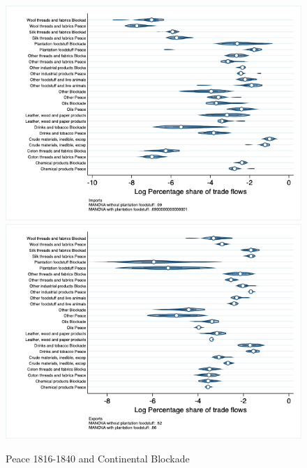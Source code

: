 \documentclass[12pt,a4paper,notitlepage,english]{article}
\begin{document}
\begin{appendix}
\begin{figure}[h!]
\centering
\caption{Peace 1816-1840 and Continental Blockade}
\label{peace1816_1840_block_nat_distr_sitc}
\includegraphics[scale=.4]{peace1816_1840_block_nat_distr_Isitc}
\includegraphics[scale=.4]{peace1816_1840_block_nat_distr_Xsitc}
\end{figure}


\end{appendix}
\end{document}
